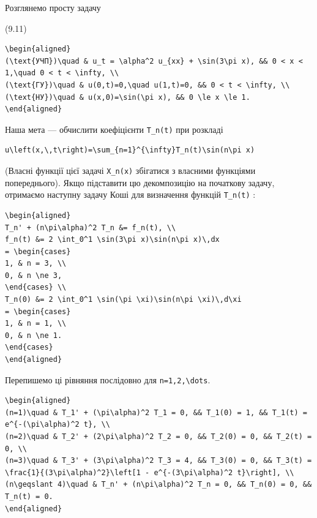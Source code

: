 \documentclass[
  ukrainian,
]{article}
\begin{document}
Розглянемо просту задачу

(9.11)

\begin{verbatim}
\begin{aligned}
(\text{УЧП})\quad & u_t = \alpha^2 u_{xx} + \sin(3\pi x), && 0 < x < 1,\quad 0 < t < \infty, \\
(\text{ГУ})\quad & u(0,t)=0,\quad u(1,t)=0, && 0 < t < \infty, \\
(\text{НУ})\quad & u(x,0)=\sin(\pi x), && 0 \le x \le 1.
\end{aligned}
\end{verbatim}

Наша мета --- обчислити коефіцієнти \texttt{T\_n(t)} при розкладі

\begin{verbatim}
u\left(x,\,t\right)=\sum_{n=1}^{\infty}T_n(t)\sin(n\pi x)
\end{verbatim}

(Власні функції цієї задачі \texttt{X\_n(x)} збігатися з власними
функціями попереднього). Якщо підставити цю декомпозицію на початкову
задачу, отримаємо наступну задачу Коші для визначення функцій
\texttt{T\_n(t)} :

\begin{verbatim}
\begin{aligned}
T_n' + (n\pi\alpha)^2 T_n &= f_n(t), \\
f_n(t) &= 2 \int_0^1 \sin(3\pi x)\sin(n\pi x)\,dx
= \begin{cases}
1, & n = 3, \\
0, & n \ne 3,
\end{cases} \\
T_n(0) &= 2 \int_0^1 \sin(\pi \xi)\sin(n\pi \xi)\,d\xi
= \begin{cases}
1, & n = 1, \\
0, & n \ne 1.
\end{cases}
\end{aligned}
\end{verbatim}

Перепишемо ці рівняння послідовно для
\texttt{n=1,2,\textbackslash{}dots}.

\begin{verbatim}
\begin{aligned}
(n=1)\quad & T_1' + (\pi\alpha)^2 T_1 = 0, && T_1(0) = 1, && T_1(t) = e^{-(\pi\alpha)^2 t}, \\
(n=2)\quad & T_2' + (2\pi\alpha)^2 T_2 = 0, && T_2(0) = 0, && T_2(t) = 0, \\
(n=3)\quad & T_3' + (3\pi\alpha)^2 T_3 = 4, && T_3(0) = 0, && T_3(t) = \frac{1}{(3\pi\alpha)^2}\left[1 - e^{-(3\pi\alpha)^2 t}\right], \\
(n\geqslant 4)\quad & T_n' + (n\pi\alpha)^2 T_n = 0, && T_n(0) = 0, && T_n(t) = 0.
\end{aligned}
\end{verbatim}
\end{document}
